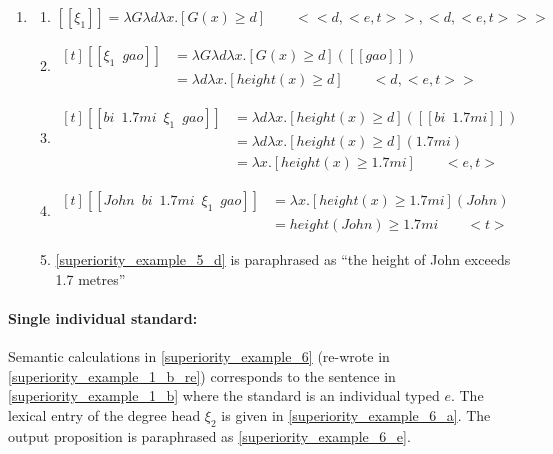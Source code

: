 \documentclass{ctexart}
\begin{document}
\begin{enumerate}
    \item \label{superiority_example_5}
    \begin{enumerate}
        \item \label{superiority_example_5_a}
        $[\![\xi_1]\!] = \lambda G \lambda d \lambda x.[G(x) \geq d] \qquad <<d,<e,t>>,<d,<e,t>>>$

        \item \label{superiority_example_5_b}
        $\begin{aligned}[t]
            [\![\xi_1 \enspace gao]\!] &= \lambda G \lambda d \lambda x.[G(x) \geq d]([\![gao]\!]) \\
            &= \lambda d \lambda x.[height(x) \geq d] \qquad <d,<e,t>>
        \end{aligned}$

        \item \label{superiority_example_5_c}
        $\begin{aligned}[t]
            [\![bi \enspace 1.7mi \enspace \xi_1 \enspace gao]\!] &= \lambda d \lambda x.[height(x) \geq d]([\![bi \enspace 1.7mi]\!]) \\
            &= \lambda d \lambda x.[height(x) \geq d](1.7mi) \\
            &= \lambda x.[height(x) \geq 1.7mi] \qquad <e,t>
        \end{aligned}$

        \item \label{superiority_example_5_d}
        $\begin{aligned}[t]
            [\![John \enspace bi \enspace 1.7mi \enspace \xi_1 \enspace gao]\!] &= \lambda x.[height(x) \geq 1.7mi](John) \\
            &= height(John) \geq 1.7mi \qquad <t>
        \end{aligned}$

        \item \label{superiority_example_5_e}
        \ref{superiority_example_5_d} is paraphrased as ``the height of John exceeds 1.7 metres''

    \end{enumerate}
\end{enumerate}

\paragraph{Single individual standard:}

Semantic calculations in \ref{superiority_example_6} (re-wrote in \ref{superiority_example_1_b_re}) corresponds to the sentence in \ref{superiority_example_1_b} where the standard is an individual typed $e$. The lexical entry of the degree head $\xi_2$ is given in \ref{superiority_example_6_a}. The output proposition is paraphrased as \ref{superiority_example_6_e}.
\end{document}
